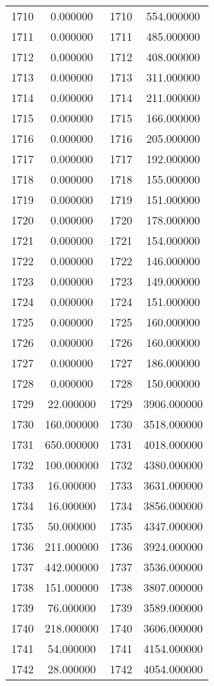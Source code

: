 \documentclass[12pt]{article}
\begin{document}
\begin{longtable}{@{}cccc@{}}
1710 & 0.000000 & 1710 & 554.000000 \\
1711 & 0.000000 & 1711 & 485.000000 \\
1712 & 0.000000 & 1712 & 408.000000 \\
1713 & 0.000000 & 1713 & 311.000000 \\
1714 & 0.000000 & 1714 & 211.000000 \\
1715 & 0.000000 & 1715 & 166.000000 \\
1716 & 0.000000 & 1716 & 205.000000 \\
1717 & 0.000000 & 1717 & 192.000000 \\
1718 & 0.000000 & 1718 & 155.000000 \\
1719 & 0.000000 & 1719 & 151.000000 \\
1720 & 0.000000 & 1720 & 178.000000 \\
1721 & 0.000000 & 1721 & 154.000000 \\
1722 & 0.000000 & 1722 & 146.000000 \\
1723 & 0.000000 & 1723 & 149.000000 \\
1724 & 0.000000 & 1724 & 151.000000 \\
1725 & 0.000000 & 1725 & 160.000000 \\
1726 & 0.000000 & 1726 & 160.000000 \\
1727 & 0.000000 & 1727 & 186.000000 \\
1728 & 0.000000 & 1728 & 150.000000 \\
1729 & 22.000000 & 1729 & 3906.000000 \\
1730 & 160.000000 & 1730 & 3518.000000 \\
1731 & 650.000000 & 1731 & 4018.000000 \\
1732 & 100.000000 & 1732 & 4380.000000 \\
1733 & 16.000000 & 1733 & 3631.000000 \\
1734 & 16.000000 & 1734 & 3856.000000 \\
1735 & 50.000000 & 1735 & 4347.000000 \\
1736 & 211.000000 & 1736 & 3924.000000 \\
1737 & 442.000000 & 1737 & 3536.000000 \\
1738 & 151.000000 & 1738 & 3807.000000 \\
1739 & 76.000000 & 1739 & 3589.000000 \\
1740 & 218.000000 & 1740 & 3606.000000 \\
1741 & 54.000000 & 1741 & 4154.000000 \\
1742 & 28.000000 & 1742 & 4054.000000 \\

\end{longtable}
\end{document}

